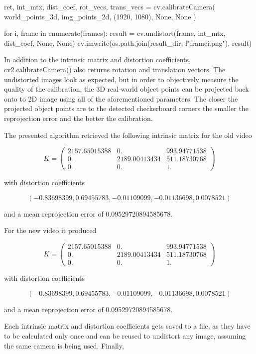 \documentclass[bibliography=totoc]{scrartcl}
\begin{document}
\begin{python}
ret, int_mtx, dist_coef, rot_vecs, trans_vecs = cv.calibrateCamera(
    world_points_3d, img_points_2d, (1920, 1080), None, None
)

for i, frame in enumerate(frames):
    result = cv.undistort(frame, int_mtx, dist_coef, None, None)
    cv.imwrite(os.path.join(result_dir, f"frame{i}.png"), result)
\end{python}

In addition to the intrinsic matrix and distortion coefficients, cv2.calibrateCamera() also returns rotation and translation vectors.
The undistorted images look as expected, but in order to objectively measure the quality of the calibration, the 3D real-world object points can be projected back onto to 2D image using all of the aforementioned parameters.
The closer the projected object points are to the detected checkerboard corners the smaller the reprojection error and the better the calibration.

The presented algorithm retrieved the following intrinsic matrix for the old video

$$
K =
\begin{pmatrix}
    2157.65015388 & 0. & 993.94771538 \\
    0. & 2189.00413434 & 511.18730768 \\
    0. & 0. & 1.
\end{pmatrix}
$$

with distortion coefficients

$$(-0.83698399, 0.69455783, -0.01109099, -0.01136698, 0.0078521)$$

and a mean reprojection error of 0.09529720894585678.

For the new video it produced 

$$
K =
\begin{pmatrix}
    2157.65015388 & 0. & 993.94771538 \\
    0. & 2189.00413434 & 511.18730768 \\
    0. & 0. & 1.
\end{pmatrix}
$$

with distortion coefficients

$$(-0.83698399, 0.69455783, -0.01109099, -0.01136698, 0.0078521)$$

and a mean reprojection error of 0.09529720894585678.

Each intrinsic matrix and distortion coefficients gets saved to a file, as they have to be calculated only once and can be reused to undistort any image, assuming the same camera is being used.
Finally,

\clearpage


\end{document}
